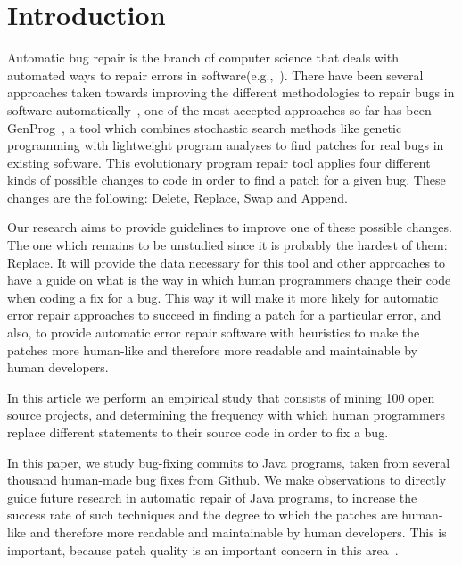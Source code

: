 
\section{Introduction}

Automatic bug repair is the branch of computer science that deals with automated ways to repair errors in software(e.g.,~\cite{kim2013,legoues2012,Mechtaev15,Long2016}). There have been several approaches taken towards improving the different methodologies to repair bugs in software automatically~\cite{dongsun, weimer, claire, kai}, one of the most accepted approaches so far has been GenProg~\cite{weimer, claire}, a tool which combines stochastic search methods like genetic programming with lightweight program analyses to find patches for real bugs in existing software. This evolutionary program repair tool applies four different kinds of possible changes to code in order to find a patch for a given bug. These changes are the following: Delete, Replace, Swap and Append.

Our research aims to provide guidelines to improve one of these possible changes. The one which remains to be unstudied since it is probably the hardest of them: Replace. It will provide the data necessary for this tool and other approaches to have a guide on what is the way in which human programmers change their code when coding a fix for a bug. This way it will make it more likely for automatic error repair approaches to succeed in finding a patch for a particular error, and also, to provide automatic error repair software with heuristics to make the patches more human-like and therefore more readable and maintainable by human developers.

In this article we perform an empirical study that consists of mining 100 open source projects, and determining the frequency with which human programmers replace different statements to their source code in order to fix a bug.



In this paper, we study bug-fixing commits to Java programs, 
taken from several thousand human-made bug fixes from Github. We make
observations to directly guide future research in automatic repair of Java
programs, to increase the success rate of such techniques and the degree to
which the patches are human-like and therefore more readable and maintainable by
human developers. This is important, because patch quality is an important
concern in this area~\cite{Qi15}.


